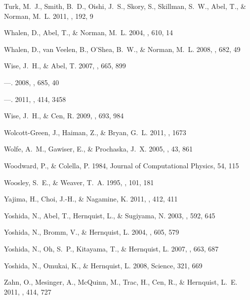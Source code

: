 \documentclass[12pt,preprint]{aastex}
\begin{document}
\begin{thebibliography}{108}
{Turk}, M.~J., {Smith}, B.~D., {Oishi}, J.~S., {Skory}, S., {Skillman}, S.~W.,
  {Abel}, T., \& {Norman}, M.~L. 2011, \apjs, 192, 9

{Whalen}, D., {Abel}, T., \& {Norman}, M.~L. 2004, \apj, 610, 14

{Whalen}, D., {van Veelen}, B., {O'Shea}, B.~W., \& {Norman}, M.~L. 2008, \apj,
  682, 49

{Wise}, J.~H., \& {Abel}, T. 2007, \apj, 665, 899

---. 2008, \apj, 685, 40

---. 2011, \mnras, 414, 3458

{Wise}, J.~H., \& {Cen}, R. 2009, \apj, 693, 984

{Wolcott-Green}, J., {Haiman}, Z., \& {Bryan}, G.~L. 2011, \mnras, 1673

{Wolfe}, A.~M., {Gawiser}, E., \& {Prochaska}, J.~X. 2005, \araa, 43, 861

{Woodward}, P., \& {Colella}, P. 1984, Journal of Computational Physics, 54,
  115

{Woosley}, S.~E., \& {Weaver}, T.~A. 1995, \apjs, 101, 181

{Yajima}, H., {Choi}, J.-H., \& {Nagamine}, K. 2011, \mnras, 412, 411

{Yoshida}, N., {Abel}, T., {Hernquist}, L., \& {Sugiyama}, N. 2003, \apj, 592,
  645

{Yoshida}, N., {Bromm}, V., \& {Hernquist}, L. 2004, \apj, 605, 579

{Yoshida}, N., {Oh}, S.~P., {Kitayama}, T., \& {Hernquist}, L. 2007, \apj, 663,
  687

{Yoshida}, N., {Omukai}, K., \& {Hernquist}, L. 2008, Science, 321, 669

{Zahn}, O., {Mesinger}, A., {McQuinn}, M., {Trac}, H., {Cen}, R., \&
  {Hernquist}, L.~E. 2011, \mnras, 414, 727

\end{thebibliography}
\end{document}
